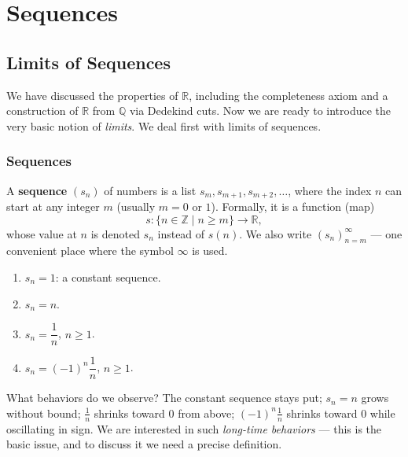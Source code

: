 \documentclass[11pt]{report}
\begin{document}
\chapter{Sequences}


\section{Limits of Sequences}

We have discussed the properties of $\mathbb{R}$, including the completeness axiom and a construction of $\mathbb{R}$ from $\mathbb{Q}$ via Dedekind cuts. Now we are ready to introduce the very basic notion of \emph{limits}. We deal first with limits of sequences.

\subsection{Sequences}

\begin{defbox}[Sequence]
A \textbf{sequence} $(s_n)$ of numbers is a list $s_m, s_{m+1}, s_{m+2}, \ldots$, where the index $n$ can start at any integer $m$ (usually $m = 0$ or $1$). Formally, it is a function (map)
\[
s : \{n \in \mathbb{Z} \mid n \geq m\} \to \mathbb{R},
\]
whose value at $n$ is denoted $s_n$ instead of $s(n)$. We also write $(s_n)_{n=m}^{\infty}$ --- one convenient place where the symbol $\infty$ is used.
\end{defbox}

\begin{exbox}
\begin{enumerate}[label=(\arabic*)]
    \item $s_n = 1$: a constant sequence.
    \item $s_n = n$.
    \item $s_n = \dfrac{1}{n}$, $n \geq 1$.
    \item $s_n = (-1)^n \dfrac{1}{n}$, $n \geq 1$.
\end{enumerate}
What behaviors do we observe? The constant sequence stays put; $s_n = n$ grows without bound; $\tfrac1n$ shrinks toward $0$ from above; $(-1)^n \tfrac1n$ shrinks toward $0$ while oscillating in sign. We are interested in such \emph{long-time behaviors} --- this is the basic issue, and to discuss it we need a precise definition.
\end{exbox}
\end{document}
